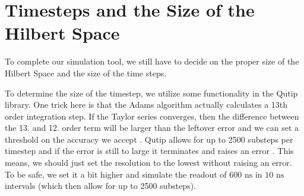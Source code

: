 








\section{Timesteps and the Size of the Hilbert Space}\label{sec:hilbert_space}
To complete our simulation tool, we still have to decide on the proper size of the Hilbert Space and the size of the time steps. 

To determine the size of the timestep, we utilize some functionality in the Qutip library. One trick here is that the Adams algorithm actually calculates a 13th order integration step. If the Taylor series converges, then the difference between the 13. and 12. order term will be larger than the leftover error and we can set a threshold on the accuracy we accept \cite{lindstrom_kalkulus_2016}. Qutip allows for up to 2500 substeps per timestep and if the error is still to large it terminates and raises an error \cite{johansson_qutip_2012}. This means, we should just set the resolution to the lowest without raising an error. To be safe, we set it a bit higher and simulate the readout of $600 \text{ ns}$ in $10 \text{ ns}$ intervals (which then allow for up to 2500 substeps). %

